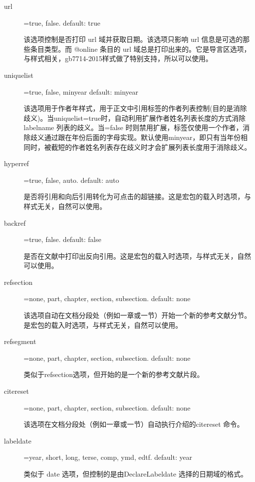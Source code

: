 \begin{description}
  \item[url]=true, false. \hfill default: true

  该选项控制是否打印 url 域并获取日期。该选项只影响 url 信息是可选的那些条目类型。而 @online 条目的 url 域总是打印出来的。它是导言区选项，与样式相关，gb7714-2015样式做了特别支持，所以可以使用。

  \item[uniquelist]=true, false, minyear \hfill default: minyear

  该选项用于作者年样式，用于正文中引用标签的作者列表控制(目的是消除歧义)。当uniquelist=true时，自动利用扩展作者姓名列表长度的方式消除labelname 列表的歧义。当=false 时则禁用扩展，标签仅使用一个作者，消除歧义通过跟在年份后面的字母实现。默认使用minyear，即只有当年份相同时，被截短的作者姓名列表存在歧义时才会扩展列表长度用于消除歧义。

  \item[hyperref]=true, false, auto. \hfill default: auto

  是否将引用和向后引用转化为可点击的超链接。这是宏包的载入时选项，与样式无关，自然可以使用。

  \item[backref]=true, false. \hfill default: false

  是否在文献中打印出反向引用。这是宏包的载入时选项，与样式无关，自然可以使用。


  \item[refsection]=none, part, chapter, section, subsection. \hfill default: none

  该选项自动在文档分段处（例如一章或一节）开始一个新的参考文献分节。是宏包的载入时选项，与样式无关，自然可以使用。

  \item[refsegment]=none, part, chapter, section, subsection. \hfill default: none

  类似于refsection选项，但开始的是一个新的参考文献片段。

  \item[citereset]=none, part, chapter, section, subsection. \hfill default: none

  该选项在文档分段处（例如一章或一节）自动执行介绍的citereset 命令。

  \item[labeldate]=year, short, long, terse, comp, ymd, edtf. \hfill default: year

  类似于 date 选项，但控制的是由DeclareLabeldate 选择的日期域的格式。


\end{description}
